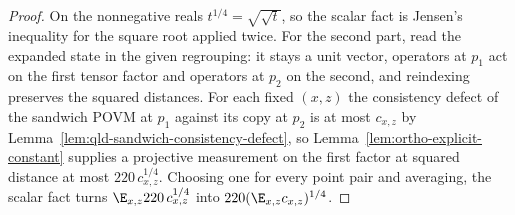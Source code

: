 \begin{proof}
	\leanok
	On the nonnegative reals $t^{1/4} = \sqrt{\sqrt t}$, so the scalar fact is
	Jensen's inequality for the square root applied twice.
	For the second part, read the expanded state in the given regrouping: it
	stays a unit vector, operators at $p_1$ act on the first tensor factor and
	operators at $p_2$ on the second, and reindexing preserves the squared
	distances. For each fixed $(x,z)$ the consistency defect of the sandwich
	POVM at $p_1$ against its copy at $p_2$ is at most $c_{x,z}$ by
	Lemma~\ref{lem:qld-sandwich-consistency-defect}, so
	Lemma~\ref{lem:ortho-explicit-constant} supplies a projective measurement
	on the first factor at squared distance at most $220\, c_{x,z}^{1/4}$.
	Choosing one for every point pair and averaging, the scalar fact turns
	$\E_{x,z} 220\, c_{x,z}^{1/4}$ into $220 (\E_{x,z} c_{x,z})^{1/4}$.
\end{proof}

